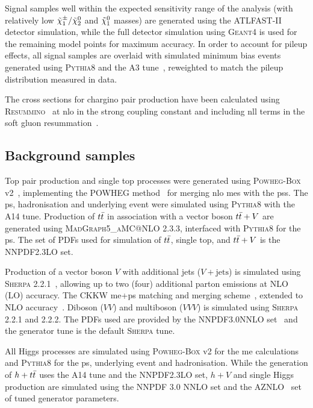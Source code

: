 Signal samples well within the expected sensitivity range of the analysis (with relatively low $\tilde{\chi}_1^\pm/\tilde{\chi}_2^0$ and $\tilde{\chi}_1^0$ masses) are generated using the \textsc{ATLFAST-II} detector simulation, while the full detector simulation using \textsc{Geant4} is used for the remaining model points for maximum accuracy. In order to account for pileup effects, all signal samples are overlaid with simulated minimum bias events generated using \textsc{Pythia8} and the A3 tune~\cite{ATL-PHYS-PUB-2016-017}, reweighted to match the pileup distribution measured in data. 

The cross sections for chargino pair production have been calculated using \textsc{Resummino}~\cite{Fuks:2013vua} at \gls{nlo} in the strong coupling constant and including \gls{nll} terms in the soft gluon resummation~\cite{Fiaschi:2018hgm,Fuks:2012qx}.

\subsection{Background samples}

Top pair production and single top processes were generated using \textsc{Powheg-Box} v2~\cite{PowhegBox:2010xd}, implementing the \textsc{POWHEG} method~\cite{Powheg1,Powheg2} for merging \gls{nlo} \glspl{me} with the \glspl{ps}. The \gls{ps}, hadronisation and underlying event were simulated using \textsc{Pythia8} with the A14 tune. Production of $t\bar{t}$ in association with a vector boson $t\bar{t}+V$ are generated using \textsc{MadGraph5\_aMC@NLO} 2.3.3, interfaced with \textsc{Pythia8} for the \gls{ps}. The set of \glspl{PDF} used for simulation of $t\bar{t}$, single top, and $t\bar{t}+V$ is the NNPDF2.3LO set.

Production of a vector boson $V$ with additional jets ($V+\mathrm{jets}$) is simulated using \textsc{Sherpa} 2.2.1~\cite{Gleisberg:2008ta,Bothmann:2019yzt}, allowing up to two (four) additional parton emissions at NLO (LO) accuracy. The CKKW \gls{me}+\gls{ps} matching and merging scheme~\cite{Hoeche:2009rj,Catani:2001cc}, extended to NLO accuracy~\cite{Hoeche:2012yf}. Diboson ($VV$) and multiboson ($VVV$) is simulated using \textsc{Sherpa} 2.2.1 and 2.2.2. The \glspl{PDF} used are provided by the NNPDF3.0NNLO set~\cite{Ball:2014uwa} and the generator tune is the default \textsc{Sherpa} tune.

All Higgs processes are simulated using \textsc{Powheg-Box} v2 for the \gls{me} calculations and \textsc{Pythia8} for the \gls{ps}, underlying event and hadronisation. While the generation of $h+t\bar{t}$ uses the A14 tune and the NNPDF2.3LO set, $h+V$ and single Higgs production are simulated using the NNPDF 3.0 NNLO set and the AZNLO~\cite{ATL-PHYS-PUB-2013-017} set of tuned generator parameters.

